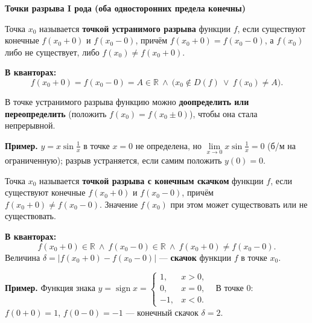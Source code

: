 \documentclass[a4paper,11pt]{article}
\newcommand{\R}{\mathbb{R}}
\newcommand{\kv}{\par\noindent\textbf{\textcolor{oprc!85!black}{В кванторах:}}}
\newcommand{\podr}[1]{\par\needspace{8\baselineskip}\medskip
  {\large\bfseries\textcolor{oprc!80!black}{#1}}\par\nopagebreak\smallskip}
\begin{document}
\podr{Точки разрыва I рода (оба односторонних предела конечны)}

\begin{opr}
Точка $x_0$ называется \textbf{точкой устранимого разрыва} функции $f$, если существуют конечные $f(x_0 + 0)$ и $f(x_0 - 0)$,
причём $f(x_0 + 0) = f(x_0 - 0)$, а $f(x_0)$ либо не существует, либо $f(x_0) \ne f(x_0 + 0)$.
\kv
\[
  f(x_0 + 0) = f(x_0 - 0) = A \in \R \ \wedge\ \bigl( x_0 \notin D(f) \ \vee\ f(x_0) \ne A \bigr).
\]
\end{opr}

\begin{center}
\end{center}

В точке устранимого разрыва функцию можно \textbf{доопределить или переопределить} (положить $f(x_0) = f(x_0 \pm 0)$), чтобы она стала непрерывной.

\textbf{Пример.} $y = x \sin\frac1x$ в точке $x = 0$ не определена, но $\lim\limits_{x \to 0} x \sin\frac1x = 0$ (б/м на ограниченную);
разрыв устраняется, если самим положить $y(0) = 0$.

\begin{opr}
Точка $x_0$ называется \textbf{точкой разрыва с конечным скачком} функции $f$, если существуют конечные $f(x_0 + 0)$ и $f(x_0 - 0)$,
причём $f(x_0 + 0) \ne f(x_0 - 0)$. Значение $f(x_0)$ при этом может существовать или не существовать.
\kv
\[
  f(x_0 + 0) \in \R \ \wedge\ f(x_0 - 0) \in \R \ \wedge\ f(x_0 + 0) \ne f(x_0 - 0).
\]
Величина $\delta = \bigl|f(x_0 + 0) - f(x_0 - 0)\bigr|$ --- \textbf{скачок} функции $f$ в точке $x_0$.
\end{opr}

\textbf{Пример.} Функция знака
$y = \operatorname{sign} x = \begin{cases} 1, & x > 0,\\ 0, & x = 0,\\ -1, & x < 0. \end{cases}$
\ В точке $0$: $f(0 + 0) = 1$, $f(0 - 0) = -1$ --- конечный скачок $\delta = 2$.
\end{document}
